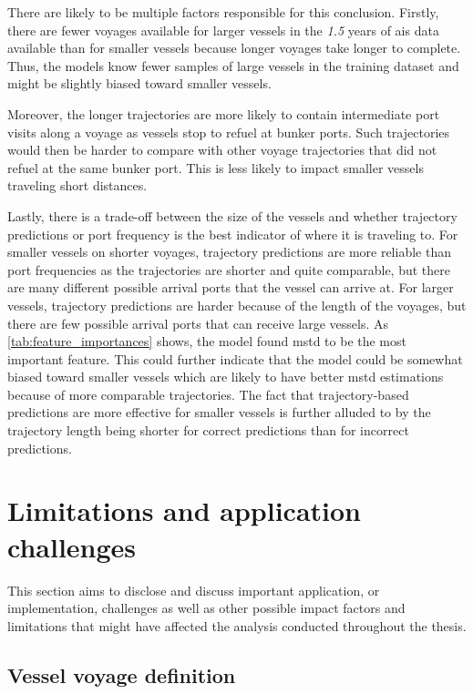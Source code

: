 There are likely to be multiple factors responsible for this conclusion. Firstly, there are fewer voyages available for larger vessels in the \textit{1.5} years of \acrshort{ais} data available than for smaller vessels because longer voyages take longer to complete. Thus, the models know fewer samples of large vessels in the training dataset and might be slightly biased toward smaller vessels.

Moreover, the longer trajectories are more likely to contain intermediate port visits along a voyage as vessels stop to refuel at bunker ports. Such trajectories would then be harder to compare with other voyage trajectories that did not refuel at the same bunker port. This is less likely to impact smaller vessels traveling short distances.

Lastly, there is a trade-off between the size of the vessels and whether trajectory predictions or port frequency is the best indicator of where it is traveling to. For smaller vessels on shorter voyages, trajectory predictions are more reliable than port frequencies as the trajectories are shorter and quite comparable, but there are many different possible arrival ports that the vessel can arrive at. For larger vessels, trajectory predictions are harder because of the length of the voyages, but there are few possible arrival ports that can receive large vessels. As \cref{tab:feature_importances} shows, the model found \acrshort{mstd} to be the most important feature. This could further indicate that the model could be somewhat biased toward smaller vessels which are likely to have better \acrshort{mstd} estimations because of more comparable trajectories. The fact that trajectory-based predictions are more effective for smaller vessels is further alluded to by the trajectory length being shorter for correct predictions than for incorrect predictions.

\section{Limitations and application challenges}

This section aims to disclose and discuss important application, or implementation, challenges as well as other possible impact factors and limitations that might have affected the analysis conducted throughout the thesis.

\subsection{Vessel voyage definition}

